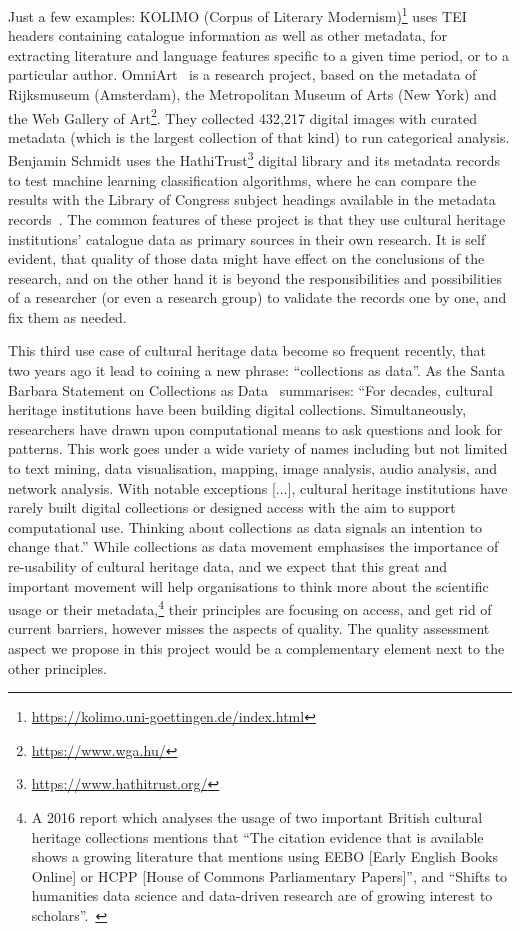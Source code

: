 Just a few examples: KOLIMO (Corpus of Literary Modernism)\footnote{\url{https://kolimo.uni-goettingen.de/index.html}} uses TEI headers containing catalogue information as well as other metadata, for extracting literature and language features specific to a given time period, or to a particular author. OmniArt~\cite{strezoski2017} is a research project, based on the metadata of Rijksmuseum (Amsterdam), the Metropolitan Museum of Arts (New York) and the Web Gallery of Art\footnote{\url{https://www.wga.hu/}}. They collected 432,217 digital images with curated metadata (which is the largest collection of that kind) to run categorical analysis. Benjamin Schmidt uses the HathiTrust\footnote{\url{https://www.hathitrust.org/}} digital library and its metadata records to test machine learning classification algorithms, where he can compare the results with the Library of Congress subject headings available in the metadata records~\cite{smith2017}. The common features of these project is that they use cultural heritage institutions’ catalogue data as primary sources in their own research. It is self evident, that quality of those data might have effect on the conclusions of the research, and on the other hand it is beyond the responsibilities and possibilities of a researcher (or even a research group) to validate the records one by one, and fix them as needed.

This third use case of cultural heritage data become so frequent recently, that two years ago it lead to coining a new phrase: ``collections as data''. As the Santa Barbara Statement on Collections as Data~\cite{santabarbarastatement2017} summarises: ``For decades, cultural heritage institutions have been building digital collections. Simultaneously, researchers have drawn upon computational means to ask questions and look for patterns. This work goes under a wide variety of names including but not limited to text mining, data visualisation, mapping, image analysis, audio analysis, and network analysis. With notable exceptions [...], cultural heritage institutions have rarely built digital collections or designed access with the aim to support computational use. Thinking about collections as data signals an intention to change that.'' While collections as data movement emphasises the importance of re-usability of cultural heritage data, and we expect that this great and important movement will help organisations to think more about the scientific usage or their metadata,\footnote{A 2016 report which analyses the usage of two important British cultural heritage collections mentions that ``The citation evidence that is available shows a growing literature that mentions using EEBO [Early English Books Online] or HCPP [House of Commons Parliamentary Papers]'', and ``Shifts to humanities data science and data-driven research are of growing interest to scholars''.~\cite{meyer2016}} their principles are focusing on access, and get rid of current barriers, however misses the aspects of quality. The quality assessment aspect we propose in this project would be a complementary element next to the other principles.

